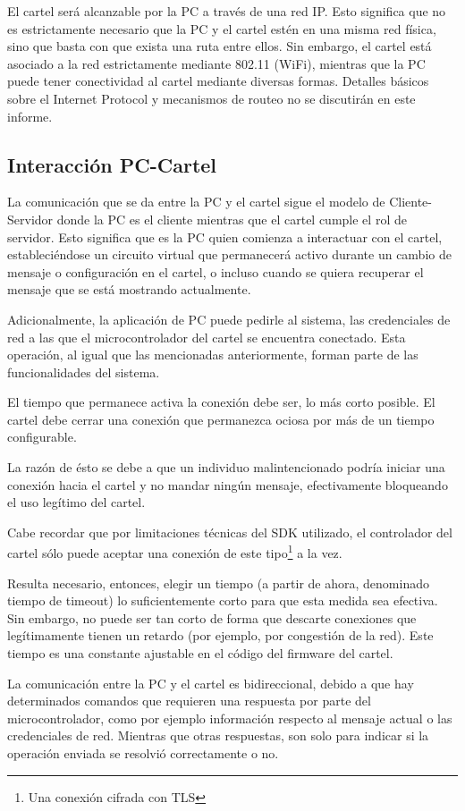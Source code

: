 El cartel será alcanzable por la PC a través de una red IP. Esto significa que no es estrictamente necesario que la PC y el cartel estén en una misma red física, sino que basta con que exista una ruta entre ellos. Sin embargo, el cartel está asociado a la red estrictamente mediante 802.11 (WiFi), mientras que la PC puede tener conectividad al cartel mediante diversas formas. Detalles básicos sobre el Internet Protocol y mecanismos de routeo no se discutirán en este informe.

\subsection{Interacción PC-Cartel}
La comunicación que se da entre la PC y el cartel sigue el modelo de Cliente-Servidor donde la PC es el cliente mientras que el cartel cumple el rol de servidor. Esto significa que es la PC quien comienza a interactuar con el cartel, estableciéndose un circuito virtual que permanecerá activo durante un cambio de mensaje o configuración en el cartel, o incluso cuando se quiera recuperar el mensaje que se está mostrando actualmente.

Adicionalmente, la aplicación de PC puede pedirle al sistema, las credenciales de red a las que el microcontrolador del cartel se encuentra conectado. Esta operación, al igual que las mencionadas anteriormente, forman parte de las funcionalidades del sistema.

El tiempo que permanece activa la conexión debe ser, lo más corto posible. El cartel debe cerrar una conexión que permanezca ociosa por más de un tiempo configurable.

La razón de ésto se debe a que un individuo malintencionado podría iniciar una conexión hacia el cartel y no mandar ningún mensaje, efectivamente bloqueando el uso legítimo del cartel.

Cabe recordar que por limitaciones técnicas del SDK utilizado, el controlador del cartel sólo puede aceptar una conexión de este tipo\footnote{Una conexión cifrada con TLS} a la vez. 

Resulta necesario, entonces, elegir un tiempo (a partir de ahora, denominado tiempo de timeout) lo suficientemente corto para que esta medida sea efectiva. Sin embargo, no puede ser tan corto de forma que descarte conexiones que legítimamente tienen un retardo (por ejemplo, por congestión de la red).  Este tiempo es una constante ajustable en el código del firmware del cartel.

La comunicación entre la PC y el cartel es bidireccional, debido a que hay determinados comandos que requieren una respuesta por parte del microcontrolador, como por ejemplo información respecto al mensaje actual o las credenciales de red.
Mientras que otras respuestas, son solo para indicar si la operación enviada se resolvió correctamente o no.

